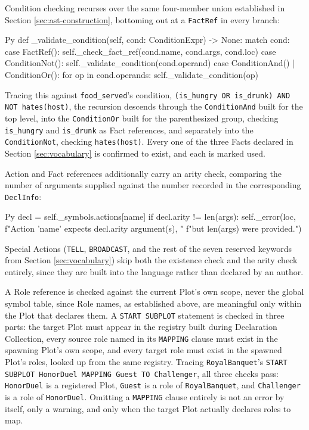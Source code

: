 Condition checking recurses over the same four-member union established in Section \ref{sec:ast-construction}, bottoming out at a \lstinline|FactRef| in every branch:
\begin{codeblock}[]{Py}
def _validate_condition(self, cond: ConditionExpr) -> None:
    match cond:
        case FactRef():
            self._check_fact_ref(cond.name, cond.args, cond.loc)
        case ConditionNot():
            self._validate_condition(cond.operand)
        case ConditionAnd() | ConditionOr():
            for op in cond.operands:
                self._validate_condition(op)
\end{codeblock}
Tracing this against \lstinline|food_served|'s condition, \lstinline|(is_hungry OR is_drunk) AND NOT hates(host)|, the recursion descends through the \lstinline|ConditionAnd| built for the top level, into the \lstinline|ConditionOr| built for the parenthesized group, checking \lstinline|is_hungry| and \lstinline|is_drunk| as Fact references, and separately into the \lstinline|ConditionNot|, checking \lstinline|hates(host)|. Every one of the three Facts declared in Section \ref{sec:vocabulary} is confirmed to exist, and each is marked used.

Action and Fact references additionally carry an arity check, comparing the number of arguments supplied against the number recorded in the corresponding \lstinline|DeclInfo|:
\begin{codeblock}[]{Py}
decl = self._symbols.actions[name]
if decl.arity != len(args):
    self._error(loc, f"Action '{name}' expects {decl.arity} argument(s), "
        f"but {len(args)} were provided.")
\end{codeblock}
Special Actions (\lstinline|TELL|, \lstinline|BROADCAST|, and the rest of the seven reserved keywords from Section \ref{sec:vocabulary}) skip both the existence check and the arity check entirely, since they are built into the language rather than declared by an author.

A Role reference is checked against the current Plot's own scope, never the global symbol table, since Role names, as established above, are meaningful only within the Plot that declares them. A \lstinline|START SUBPLOT| statement is checked in three parts: the target Plot must appear in the registry built during Declaration Collection, every source role named in its \lstinline|MAPPING| clause must exist in the spawning Plot's own scope, and every target role must exist in the spawned Plot's roles, looked up from the same registry. Tracing \lstinline|RoyalBanquet|'s \lstinline|START SUBPLOT HonorDuel MAPPING Guest TO Challenger|, all three checks pass: \lstinline|HonorDuel| is a registered Plot, \lstinline|Guest| is a role of \lstinline|RoyalBanquet|, and \lstinline|Challenger| is a role of \lstinline|HonorDuel|. Omitting a \lstinline|MAPPING| clause entirely is not an error by itself, only a warning, and only when the target Plot actually declares roles to map.

